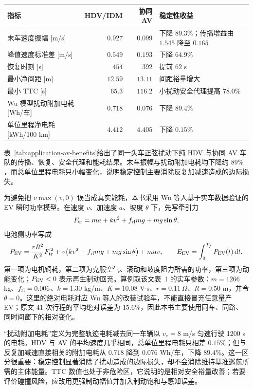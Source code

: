\documentclass[11pt,a4paper,openany]{book}
\numberwithin{equation}{chapter}
\numberwithin{figure}{chapter}
\numberwithin{table}{chapter}
\newcommand{\cnemph}[1]{{\quotefont #1}}
\newcommand{\tabletext}[2]{%
  \par\smallskip\noindent
  表~\ref{#1}给出了#2
  \par\smallskip
}
\begin{document}
\begin{center}
\small
{}
\label{tab:application-av-benefits}
\begin{tabular}{p{4.2cm}rrp{4.4cm}}
\toprule
\textbf{指标} & \textbf{HDV/IDM} & \textbf{协同 AV} & \textbf{稳定性收益} \\
\midrule
末车速度振幅 [m/s] & $0.927$ & $0.099$ & 下降 $89.3\%$；传播增益由 $1.545$ 降至 $0.165$ \\
峰值速度标准差 [m/s] & $0.549$ & $0.193$ & 下降 $64.9\%$ \\
恢复时刻 [s] & $454$ & $392$ & 提前 $62$ s \\
最小净间距 [m] & $12.59$ & $13.11$ & 间距裕量增大 \\
最小 TTC [s] & $65.3$ & $116.2$ & 小扰动安全代理提高 $78.0\%$ \\
Wu 模型扰动附加电耗 [Wh/车] & $0.718$ & $0.076$ & 下降 $89.4\%$ \\
单位里程净电耗 [kWh/100 km] & $4.412$ & $4.405$ & 下降 $0.15\%$ \\
\bottomrule
\end{tabular}
\end{center}
\tabletext{tab:application-av-benefits}{同一头车正弦扰动下纯 HDV 与协同 AV 车队的传播、恢复、安全代理和能耗结果。末车振幅与扰动附加电耗均下降约 $89\%$，而总单位里程电耗只小幅变化，说明稳定控制主要消除反复加减速造成的边际损失。}

为避免把 $v\max(\dot v,0)$ 误当成真实能耗，本书采用 Wu 等人基于实车数据验证的 EV 瞬时功率模型\cite{wu2015ev}。在速度 $v$、加速度 $a$、坡度 $\theta$ 下，先写牵引力
\begin{equation}
F_{\rm tr}=ma+kv^2+f_{\rm rl}mg+mg\sin\theta,
\label{eq:wu-tractive-force}
\end{equation}
电池侧功率写成
\begin{equation}
P_{\rm EV}
=\frac{rR^2}{K^2}F_{\rm tr}^{\,2}
+v\!\left(kv^2+f_{\rm rl}mg+mg\sin\theta\right)+mav,
\qquad
E_{\rm EV}=\int_0^{T_f}P_{\rm EV}(t)\,{\rm d}t.
\label{eq:wu-ev-power}
\end{equation}
第一项为电机铜耗，第二项为克服空气、滚动和坡度阻力所需的功率，第三项为动能变化；$P_{\rm EV}<0$ 表示再生制动回充。算例取该文表~1 的实车参数：$m=1266$ kg、$f_{\rm rl}=0.006$、$k=1.30$ kg/m、$K=10.08$ V$\cdot$s、$r=0.11\ \Omega$、$R=0.50$ m，并令 $\theta=0$。这里的绝对电耗对应 Wu 等人的改装试验车，不能直接冒充任意量产 EV；原文 41 次行程的平均绝对误差为 $15.6\%$，因此本书主要使用同车、同路、同时间窗下的相对变化。

“扰动附加电耗”定义为完整轨迹电耗减去同一车辆以 $v_e=8$ m/s 匀速行驶 1200 s 的电耗。HDV 与 AV 的平均速度几乎相同，总单位里程电耗只相差 $0.15\%$；但与反复加减速直接相关的附加电耗从 $0.718$ 降到 $0.076$ Wh/车，下降 $89.4\%$。这一区分很重要：稳定控制显著消除了\cnemph{扰动造成的边际损失}，却不会消除维持基准巡航所需的主体能量。TTC 数值也处于非危险区，它说明的是相对安全裕量改善；若要评价碰撞风险，应改用更强制动幅值并加入制动饱和与感知误差。
\end{document}
